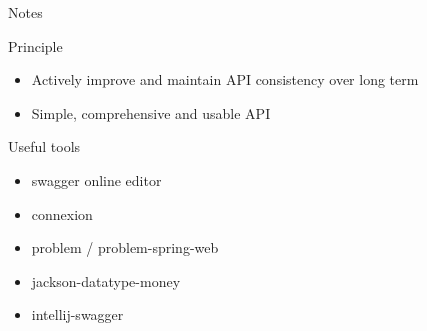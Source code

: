 \documentclass[10pt]{beamer}
\begin{document}
\begin{frame}{Notes}

  \begin{block}{Principle}

    \begin{itemize}

      \item
            Actively improve and maintain API consistency over long term
      \item
            Simple, comprehensive and usable API
    \end{itemize}

  \end{block}
\end{frame}

\begin{frame}{Useful tools}
  \begin{itemize}
    \item swagger online editor
    \item connexion
    \item problem / problem-spring-web
    \item jackson-datatype-money
    \item intellij-swagger
  \end{itemize}
\end{frame}
\end{document}
